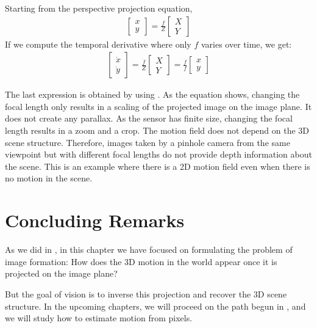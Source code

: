 Starting from the perspective projection equation,
\begin{align}
\begin{bmatrix}
x \\
y
\end{bmatrix}
= \frac{f}{Z}
\begin{bmatrix}
X \\
Y
\end{bmatrix}
\label{eq:pers_proj}
\end{align}
If we compute the temporal derivative where only $f$ varies over time, we get:
\begin{align}
\begin{bmatrix}
\dot{x} \\
\dot{y}
\end{bmatrix}
= \frac{\dot{f}}{Z}
\begin{bmatrix}
X \\
Y
\end{bmatrix}
= 
\frac{\dot{f}}{f}
\begin{bmatrix}
x \\
y
\end{bmatrix}
\end{align}

The last expression is obtained by using \eqn{\ref{eq:pers_proj}}. As the equation shows, changing the focal length only results in a scaling of the projected image on the image plane. It does not create any parallax. As the sensor has finite size, changing the focal length results in a zoom and a crop. The motion field does not depend on the 3D scene structure. Therefore, images taken by a pinhole camera from the same viewpoint but with different focal lengths do not provide depth information about the scene. This is an example where there is a 2D motion field even when there is no motion in the scene. 

\section{Concluding Remarks}

As we did in \chap{\ref{chapter:imaging}}, in this chapter we have focused on formulating the problem of image formation: How does the 3D motion in the world appear once it is projected on the image plane?

But the goal of vision is to inverse this projection and recover the 3D scene structure. In the upcoming chapters, we will proceed on the path begun in  \chap{\ref{chapter:motion_estimation}}, and we will study how to estimate motion from pixels.  


